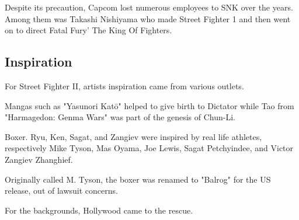 





Despite its precaution, Capcom lost numerous employees to SNK over the years. Among them was Takashi Nishiyama who made Street Fighter 1 and then went on to direct Fatal Fury' The King Of Fighters\cite{YoshikiOkamotoTakashiNishiyama}.
 














\subsection{Inspiration}
For Street Fighter II, artists inspiration came from various outlets. 

Mangas such as "Yasunori Katō" helped to give birth to Dictator while Tao from "Harmagedon: Genma Wars" was part of the genesis of Chun-Li. 

Boxer. Ryu, Ken, Sagat, and Zangiev were inspired by real life athletes, respectively Mike Tyson, Mas Oyama, Joe Lewis, Sagat Petchyindee, and Victor Zangiev Zhanghief.

\begin{trivia}
Originally called M. Tyson, the boxer was renamed to "Balrog" for the US release, out of lawsuit concerns. 
\end{trivia}


For the backgrounds, Hollywood came to the rescue.

